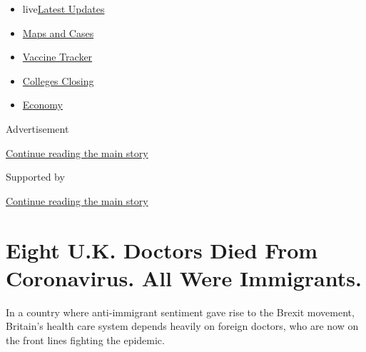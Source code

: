\begin{itemize}
\tightlist
\item
  live\href{https://www.nytimes3xbfgragh.onion/2020/08/21/world/covid-19-coronavirus.html?name=styln-coronavirus-national\&region=TOP_BANNER\&variant=undefined\&block=storyline_menu_recirc\&action=click\&pgtype=Article\&impression_id=4ad93cf1-e393-11ea-918c-0f8207e68c04}{Latest
  Updates}
\item
  \href{https://www.nytimes3xbfgragh.onion/interactive/2020/us/coronavirus-us-cases.html?name=styln-coronavirus-national\&region=TOP_BANNER\&variant=undefined\&block=storyline_menu_recirc\&action=click\&pgtype=Article\&impression_id=4ad96400-e393-11ea-918c-0f8207e68c04}{Maps
  and Cases}
\item
  \href{https://www.nytimes3xbfgragh.onion/interactive/2020/science/coronavirus-vaccine-tracker.html?name=styln-coronavirus-national\&region=TOP_BANNER\&variant=undefined\&block=storyline_menu_recirc\&action=click\&pgtype=Article\&impression_id=4ad96401-e393-11ea-918c-0f8207e68c04}{Vaccine
  Tracker}
\item
  \href{https://www.nytimes3xbfgragh.onion/2020/08/19/us/colleges-closing-covid.html?name=styln-coronavirus-national\&region=TOP_BANNER\&variant=undefined\&block=storyline_menu_recirc\&action=click\&pgtype=Article\&impression_id=4ad96402-e393-11ea-918c-0f8207e68c04}{Colleges
  Closing}
\item
  \href{https://www.nytimes3xbfgragh.onion/live/2020/08/20/business/stock-market-today-coronavirus?name=styln-coronavirus-national\&region=TOP_BANNER\&variant=undefined\&block=storyline_menu_recirc\&action=click\&pgtype=Article\&impression_id=4ad96403-e393-11ea-918c-0f8207e68c04}{Economy}
\end{itemize}

Advertisement

\protect\hyperlink{after-top}{Continue reading the main story}

Supported by

\protect\hyperlink{after-sponsor}{Continue reading the main story}

\hypertarget{eight-uk-doctors-died-from-coronavirus-all-were-immigrants}{%
\section{Eight U.K. Doctors Died From Coronavirus. All Were
Immigrants.}\label{eight-uk-doctors-died-from-coronavirus-all-were-immigrants}}

In a country where anti-immigrant sentiment gave rise to the Brexit
movement, Britain's health care system depends heavily on foreign
doctors, who are now on the front lines fighting the epidemic.

